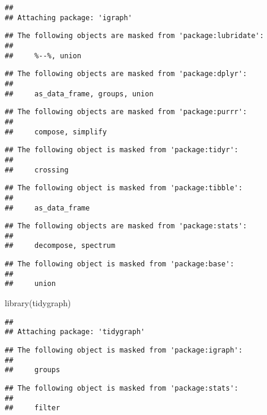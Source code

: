 \documentclass[
]{article}
\newenvironment{Shaded}{\begin{snugshade}}{\end{snugshade}}
\newcommand{\FunctionTok}[1]{\textcolor[rgb]{0.00,0.00,0.00}{#1}}
\newcommand{\NormalTok}[1]{#1}
\begin{document}
\begin{verbatim}
## 
## Attaching package: 'igraph'
\end{verbatim}

\begin{verbatim}
## The following objects are masked from 'package:lubridate':
## 
##     %--%, union
\end{verbatim}

\begin{verbatim}
## The following objects are masked from 'package:dplyr':
## 
##     as_data_frame, groups, union
\end{verbatim}

\begin{verbatim}
## The following objects are masked from 'package:purrr':
## 
##     compose, simplify
\end{verbatim}

\begin{verbatim}
## The following object is masked from 'package:tidyr':
## 
##     crossing
\end{verbatim}

\begin{verbatim}
## The following object is masked from 'package:tibble':
## 
##     as_data_frame
\end{verbatim}

\begin{verbatim}
## The following objects are masked from 'package:stats':
## 
##     decompose, spectrum
\end{verbatim}

\begin{verbatim}
## The following object is masked from 'package:base':
## 
##     union
\end{verbatim}

\begin{Shaded}
\begin{Highlighting}[]
\FunctionTok{library}\NormalTok{(tidygraph)}
\end{Highlighting}
\end{Shaded}

\begin{verbatim}
## 
## Attaching package: 'tidygraph'
\end{verbatim}

\begin{verbatim}
## The following object is masked from 'package:igraph':
## 
##     groups
\end{verbatim}

\begin{verbatim}
## The following object is masked from 'package:stats':
## 
##     filter
\end{verbatim}
\end{document}
